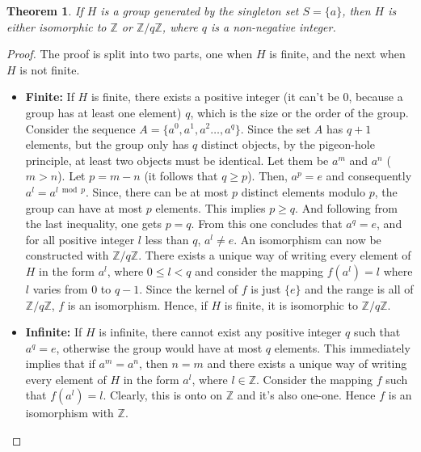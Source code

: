 \documentclass[12pt, titlepage]{article}
\newtheorem{thm}{Theorem}[section]
\theoremstyle{definition}
\begin{document}
\begin{thm}
\label{class1}
If $H$ is a group generated by the singleton set $S = \{a\}$, then $H$ is either isomorphic to $\mathbb{Z}$ or $\mathbb{Z}/q\mathbb{Z}$, where $q$ is a non-negative integer.
\end{thm}

\begin{proof}
The proof is split into two parts, one when $H$ is finite, and the next when $H$ is not finite.
\begin{itemize}
\item \textbf{Finite:} If $H$ is finite, there exists a positive integer (it can't be $0$, because a group has at least one element) $q$, which is the size or the order of the group. Consider the sequence $A = \{a^0, a^1, a^2 \ldots , a^q\}$. Since the set $A$ has $q+1$ elements, but the group only has $q$ distinct objects, by the pigeon-hole principle, at least two objects must be identical. Let them be $a^m$ and $a^n$ ($m>n$). Let $p=m-n$ (it follows that $q \geq p$). Then, $a^p=e$ and consequently $a^l = a^{l \bmod p}$. Since, there can be at most $p$ distinct elements modulo $p$, the group can have at most $p$ elements. This implies $p \geq q$. And following from the last inequality, one gets $p=q$. From this one concludes that $a^q=e$, and for all positive integer $l$ less than $q$, $a^l \neq e$. An isomorphism can now be constructed with $\mathbb{Z}/q\mathbb{Z}$. There exists a unique way of writing every element of $H$ in the form $a^l$, where $0 \leq l < q$ and consider the mapping $f(a^l) = l$ where $l$ varies from $0$ to $q-1$. Since the kernel of $f$ is just $\{e\}$ and the range is all of $\mathbb{Z}/q\mathbb{Z}$, $f$ is an isomorphism. Hence, if $H$ is finite, it is isomorphic to $\mathbb{Z}/q\mathbb{Z}$.

\item \textbf{Infinite:} If $H$ is infinite, there cannot exist any positive integer $q$ such that $a^q=e$, otherwise the group would have at most $q$ elements. This immediately implies that if $a^m = a^n$, then $n=m$ and there exists a unique way of writing every element of $H$ in the form $a^l$, where $l \in \mathbb{Z}$. Consider the mapping $f$ such that $f(a^l)=l$. Clearly, this is onto on $\mathbb{Z}$ and it's also one-one. Hence $f$ is an isomorphism with $\mathbb{Z}$.
\end{itemize}
\end{proof}
\end{document}
